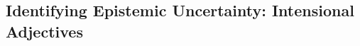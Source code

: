 \documentclass[10pt]{article}
\begin{document}
 


 

 


\vspace {-4mm}

\subsection{Identifying Epistemic Uncertainty: Intensional Adjectives}
\end{document}
